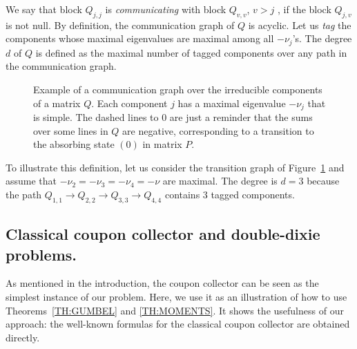 \documentclass{aptpub}
\begin{document}
We say that block $Q_{j,j}$ is {\it communicating} with block
$Q_{v,v}$, $v>j$ , if the block $Q_{j,v}$ is not null. By definition,
the communication graph of $Q$ is acyclic. Let us {\it tag} the
components whose maximal eigenvalues are maximal among all $-\nu_j$'s.
The degree $d$ of $Q$ is defined as the maximal number of tagged
components over any path in the communication graph.

\begin{figure}[ht]
  \centering
  \caption{Example of a communication graph over the irreducible
    components of a matrix $Q$. Each component $j$ has a maximal
    eigenvalue $-\nu_j$ that is simple. The dashed lines to $0$ are
    just a reminder that the sums over some lines in $Q$ are negative,
    corresponding to a transition to the absorbing state $(0)$ in
    matrix $P$.}
  \label{fig:irreducible}
\end{figure}

To illustrate this definition, let us consider the transition graph of
Figure~\ref{fig:irreducible} and assume that
$-\nu_2=-\nu_3 =-\nu_4=-\nu$ are maximal. The degree is $d=3$ because
the path
$Q_{1,1}\rightarrow Q_{2,2} \rightarrow Q_{3,3} \rightarrow Q_{4,4}$
contains 3 tagged components.





\subsection{Classical coupon collector and double-dixie problems.}
\label{ssec:classic}

As mentioned in the introduction, the coupon collector can be seen as
the simplest instance of our problem. Here, we use it as an illustration of
how to use Theorems~\ref{TH:GUMBEL} and \ref{TH:MOMENTS}.  It shows
the usefulness of our approach: the well-known formulas for the
classical coupon collector are obtained directly.
\end{document}
